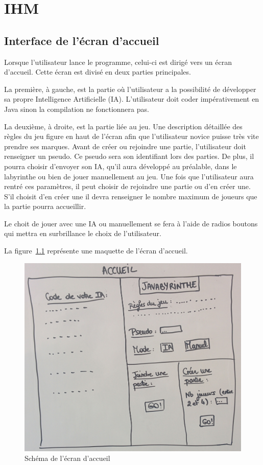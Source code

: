 \chapter{IHM}

\section{Interface de l'écran d'accueil}
	Lorsque l'utilisateur lance le programme, celui-ci est dirigé vers un écran d'accueil. Cette écran est divisé en deux parties principales.

	La première, à gauche, est la partie où l'utilisateur a la possibilité de développer sa propre Intelligence Artificielle (IA). L'utilisateur doit coder impérativement en Java sinon la compilation ne fonctionnera pas.

	La deuxième, à droite, est la partie liée au jeu. Une description détaillée des règles du jeu figure en haut de l'écran afin que l'utilisateur novice puisse très vite prendre ses marques. Avant de créer ou rejoindre une partie, l'utilisateur doit renseigner un pseudo. Ce pseudo sera son identifiant lors des parties. De plus, il pourra choisir d'envoyer son IA, qu'il aura développé au préalable, dans le labyrinthe ou bien de jouer manuellement au jeu. Une fois que l'utilisateur aura rentré ces paramètres, il peut choisir de rejoindre une partie ou d'en créer une. S'il choisit d'en créer une il devra renseigner le nombre maximum de joueurs que la partie pourra accueillir.

	Le choit de jouer avec une IA ou manuellement se fera à l'aide de radios boutons qui mettra en surbrillance le choix de l'utilisateur.

	La figure~\ref{fig:ecran_accueil} représente une maquette de l'écran d'accueil.
	\begin{figure}[h]
		\centering
		\includegraphics[width=15cm]{images/schema_ecran_accueil.jpg}
		\caption{Schéma de l'écran d'accueil}
		\label{fig:ecran_accueil}
	\end{figure}

